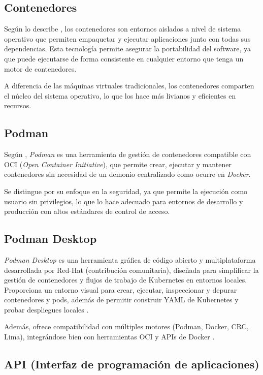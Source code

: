 \documentclass[12pt]{article}
\begin{document}
	\subsection{Contenedores}

	Según lo describe \textcite{merkel2014}, los contenedores son entornos aislados a nivel de sistema operativo que permiten empaquetar y ejecutar aplicaciones junto con todas sus dependencias. Esta tecnología permite asegurar la portabilidad del software, ya que puede ejecutarse de forma consistente en cualquier entorno que tenga un motor de contenedores.

	A diferencia de las máquinas virtuales tradicionales, los contenedores comparten el núcleo del sistema operativo, lo que los hace más livianos y eficientes en recursos.

	\subsection{Podman}

	Según \textcite{redhat2021}, \textit{Podman} es una herramienta de gestión de contenedores compatible con OCI (\textit{Open Container Initiative}), que permite crear, ejecutar y mantener contenedores sin necesidad de un demonio centralizado como ocurre en \textit{Docker}.

	Se distingue por su enfoque en la seguridad, ya que permite la ejecución como usuario sin privilegios, lo que lo hace adecuado para entornos de desarrollo y producción con altos estándares de control de acceso.

	\subsection{Podman Desktop}

	\textit{Podman Desktop} es una herramienta gráfica de código abierto y multiplataforma desarrollada por Red-Hat (contribución comunitaria), diseñada para simplificar la gestión de contenedores y flujos de trabajo de Kubernetes en entornos locales. Proporciona un entorno visual para crear, ejecutar, inspeccionar y depurar contenedores y pods, además de permitir construir YAML de Kubernetes y probar despliegues locales \parencite{redhat_podman_desktop,georger2024}.

	Además, ofrece compatibilidad con múltiples motores (Podman, Docker, CRC, Lima), integrándose bien con herramientas OCI y APIs de Docker \parencite{podman_desktop_multi}.

	\subsection{API (Interfaz de programación de aplicaciones)}
\end{document}
